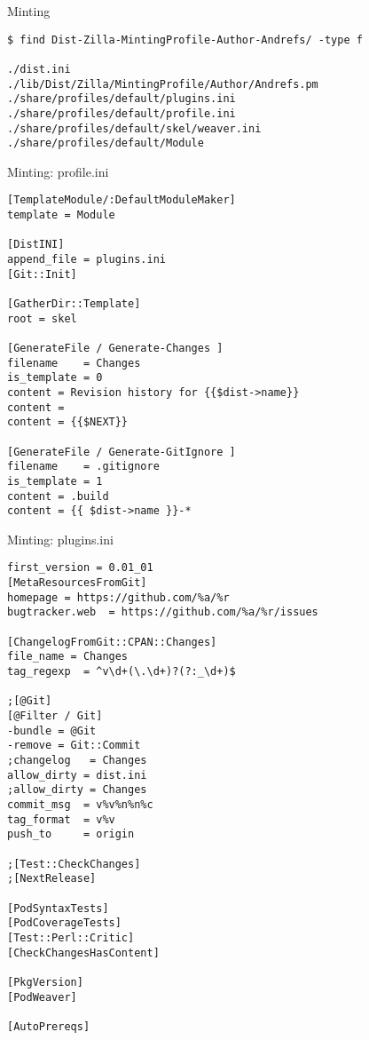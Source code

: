 \documentclass[serif,14pt,color=usenames,dvipsnames]{beamer}
\begin{document}
\begin{frame}[fragile]{Minting}
\begin{verbatim}
$ find Dist-Zilla-MintingProfile-Author-Andrefs/ -type f 

./dist.ini
./lib/Dist/Zilla/MintingProfile/Author/Andrefs.pm
./share/profiles/default/plugins.ini
./share/profiles/default/profile.ini
./share/profiles/default/skel/weaver.ini
./share/profiles/default/Module
\end{verbatim}
\end{frame}

\begin{frame}[fragile]{Minting: profile.ini}
\begin{verbatim}
[TemplateModule/:DefaultModuleMaker]
template = Module

[DistINI]
append_file = plugins.ini
[Git::Init]

[GatherDir::Template]
root = skel

[GenerateFile / Generate-Changes ]
filename    = Changes
is_template = 0
content = Revision history for {{$dist->name}}
content =
content = {{$NEXT}}

[GenerateFile / Generate-GitIgnore ]
filename    = .gitignore
is_template = 1
content = .build
content = {{ $dist->name }}-*
\end{verbatim}
\end{frame}

\begin{frame}[fragile]{Minting: plugins.ini}
\begin{verbatim}
first_version = 0.01_01
[MetaResourcesFromGit]
homepage = https://github.com/%a/%r
bugtracker.web  = https://github.com/%a/%r/issues

[ChangelogFromGit::CPAN::Changes]
file_name = Changes
tag_regexp  = ^v\d+(\.\d+)?(?:_\d+)$

;[@Git]
[@Filter / Git]
-bundle = @Git
-remove = Git::Commit
;changelog   = Changes
allow_dirty = dist.ini
;allow_dirty = Changes
commit_msg  = v%v%n%n%c
tag_format  = v%v 
push_to     = origin

;[Test::CheckChanges]
;[NextRelease]

[PodSyntaxTests]
[PodCoverageTests]
[Test::Perl::Critic]
[CheckChangesHasContent]

[PkgVersion]
[PodWeaver]

[AutoPrereqs]
\end{verbatim}
\end{frame}
\end{document}

